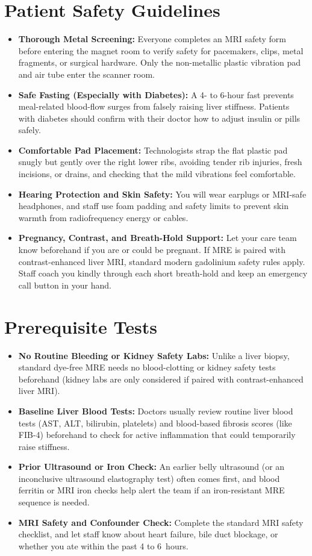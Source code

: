 \section{Patient Safety Guidelines}
\begin{itemize}
\item \textbf{Thorough Metal Screening:} Everyone completes an MRI safety form before entering the magnet room to verify safety for pacemakers, clips, metal fragments, or surgical hardware. Only the non-metallic plastic vibration pad and air tube enter the scanner room.
\item \textbf{Safe Fasting (Especially with Diabetes):} A 4- to 6-hour fast prevents meal-related blood-flow surges from falsely raising liver stiffness. Patients with diabetes should confirm with their doctor how to adjust insulin or pills safely.
\item \textbf{Comfortable Pad Placement:} Technologists strap the flat plastic pad snugly but gently over the right lower ribs, avoiding tender rib injuries, fresh incisions, or drains, and checking that the mild vibrations feel comfortable.
\item \textbf{Hearing Protection and Skin Safety:} You will wear earplugs or MRI-safe headphones, and staff use foam padding and safety limits to prevent skin warmth from radiofrequency energy or cables.
\item \textbf{Pregnancy, Contrast, and Breath-Hold Support:} Let your care team know beforehand if you are or could be pregnant. If MRE is paired with contrast-enhanced liver MRI, standard modern gadolinium safety rules apply. Staff coach you kindly through each short breath-hold and keep an emergency call button in your hand.
\end{itemize}

\section{Prerequisite Tests}
\begin{itemize}
\item \textbf{No Routine Bleeding or Kidney Safety Labs:} Unlike a liver biopsy, standard dye-free MRE needs no blood-clotting or kidney safety tests beforehand (kidney labs are only considered if paired with contrast-enhanced liver MRI).
\item \textbf{Baseline Liver Blood Tests:} Doctors usually review routine liver blood tests (AST, ALT, bilirubin, platelets) and blood-based fibrosis scores (like FIB-4) beforehand to check for active inflammation that could temporarily raise stiffness.
\item \textbf{Prior Ultrasound or Iron Check:} An earlier belly ultrasound (or an inconclusive ultrasound elastography test) often comes first, and blood ferritin or MRI iron checks help alert the team if an iron-resistant MRE sequence is needed.
\item \textbf{MRI Safety and Confounder Check:} Complete the standard MRI safety checklist, and let staff know about heart failure, bile duct blockage, or whether you ate within the past 4 to 6~hours.
\end{itemize}

